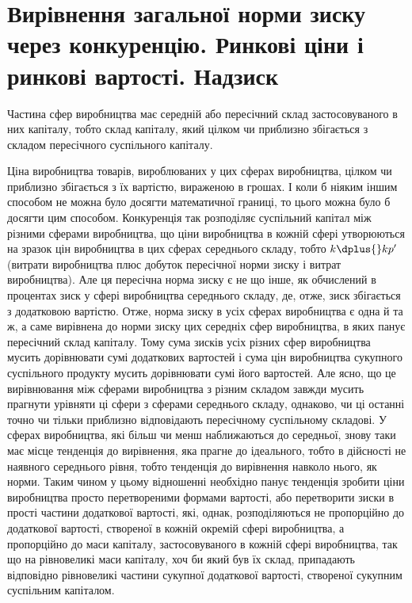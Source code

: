 
\section{%
Вирівнення загальної норми зиску через конкуренцію.
Ринкові ціни і ринкові вартості. Надзиск}
%

Частина сфер виробництва має середній або пересічний склад
застосовуваного в них капіталу, тобто склад капіталу, який цілком чи приблизно збігається з складом
пересічного суспільного
капіталу.

Ціна виробництва товарів, вироблюваних у цих сферах виробництва, цілком чи приблизно збігається з їх
вартістю, вираженою
в грошах. І коли б ніяким іншим способом не можна було досягти математичної границі, то цього можна
було б досягти цим
способом. Конкуренція так розподіляє суспільний капітал між
різними сферами виробництва, що ціни виробництва в кожній
сфері утворюються на зразок цін виробництва в цих сферах
середнього складу, тобто \deq{} $k \dplus{} kp'$ (витрати виробництва плюс
добуток пересічної норми зиску і витрат виробництва). Але
ця пересічна норма зиску є не що інше, як обчислений в процентах зиск у сфері виробництва середнього
складу, де, отже,
зиск збігається з додатковою вартістю. Отже, норма зиску в усіх
сферах виробництва є одна й та ж, а саме вирівнена до норми
зиску цих середніх сфер виробництва, в яких панує пересічний
склад капіталу. Тому сума зисків усіх різних сфер виробництва
мусить дорівнювати сумі додаткових вартостей і сума цін виробництва сукупного суспільного продукту
мусить дорівнювати
сумі його вартостей. Але ясно, що це вирівнювання між сферами виробництва з різним складом завжди
мусить прагнути
урівняти ці сфери з сферами середнього складу, однаково, чи
ці останні точно чи тільки приблизно відповідають пересічному
суспільному складові. У сферах виробництва, які більш чи менш
наближаються до середньої, знову таки має місце тенденція
до вирівнення, яка прагне до ідеального, тобто в дійсності не
наявного середнього рівня, тобто тенденція до вирівнення
навколо нього, як норми. Таким чином у цьому відношенні
необхідно панує тенденція зробити ціни виробництва просто
перетвореними формами вартості, або перетворити зиски в
прості частини додаткової вартості, які, однак, розподіляються
не пропорційно до додаткової вартості, створеної в кожній
окремій сфері виробництва, а пропорційно до маси капіталу,
застосовуваного в кожній сфері виробництва, так що на рівновеликі маси капіталу, хоч би який був їх
склад, припадають відповідно рівновеликі частини сукупної додаткової вартості, створеної сукупним
суспільним капіталом.

